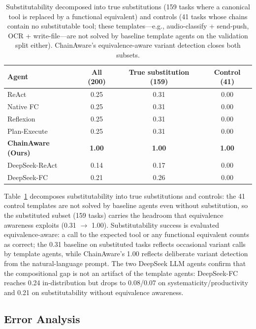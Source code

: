 ﻿\documentclass{article}
\begin{document}
\begin{table}[t]
    \centering
    \small
    \begin{tabular}{lccc}
        \toprule
        Agent & All (200) & True substitution (159) & Control (41) \\
        \midrule
        ReAct & 0.25 & 0.31 & 0.00 \\
        Native FC & 0.25 & 0.31 & 0.00 \\
        Reflexion & 0.25 & 0.31 & 0.00 \\
        Plan-Execute & 0.25 & 0.31 & 0.00 \\
        \textbf{ChainAware (Ours)} & \textbf{1.00} & \textbf{1.00} & \textbf{1.00} \\
        DeepSeek-ReAct & 0.14 & 0.17 & 0.00 \\
        DeepSeek-FC & 0.21 & 0.26 & 0.00 \\
        \bottomrule
    \end{tabular}
    \caption{Substitutability decomposed into true substitutions (159 tasks where a canonical tool is replaced by a functional equivalent) and controls (41 tasks whose chains contain no substitutable tool; these templates---e.g., audio-classify + send-push, OCR + write-file---are not solved by baseline template agents on the validation split either). ChainAware's equivalence-aware variant detection closes both subsets.}
    \label{tab:sub_decomp}
\end{table}

Table~\ref{tab:sub_decomp} decomposes substitutability into true substitutions and controls: the 41 control templates are not solved by baseline agents even without substitution, so the substituted subset (159 tasks) carries the headroom that equivalence awareness exploits (0.31 $\rightarrow$ 1.00). Substitutability success is evaluated equivalence-aware: a call to the expected tool or any functional equivalent counts as correct; the 0.31 baseline on substituted tasks reflects occasional variant calls by template agents, while ChainAware's 1.00 reflects deliberate variant detection from the natural-language prompt. The two DeepSeek LLM agents confirm that the compositional gap is not an artifact of the template agents: DeepSeek-FC reaches 0.24 in-distribution but drops to 0.08/0.07 on systematicity/productivity and 0.21 on substitutability without equivalence awareness.

\subsection{Error Analysis}
\end{document}
